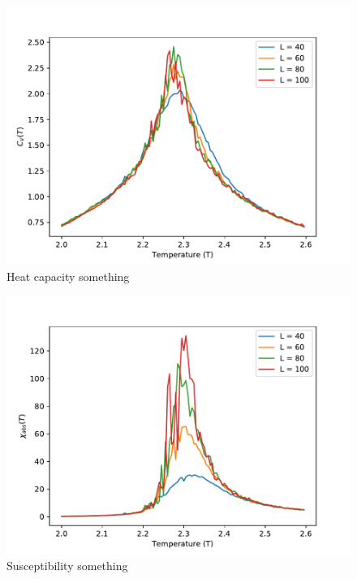 \documentclass[12pt,english,a4paper]{article}
\begin{document}
\begin{figure}[H]
    \centering
    \includegraphics[scale=0.7]{Code_Files/Figures/Cv_of_T_N_1000000000.pdf}
    \caption{Heat capacity something}
    \label{fig:Cv_of_T}
\end{figure}
\begin{figure}[H]
    \centering
    \includegraphics[scale=0.7]{Code_Files/Figures/X_of_T_N_1000000000.pdf}
    \caption{Susceptibility something}
    \label{fig:X_of_T}
\end{figure}


\printbibliography
\end{document}
